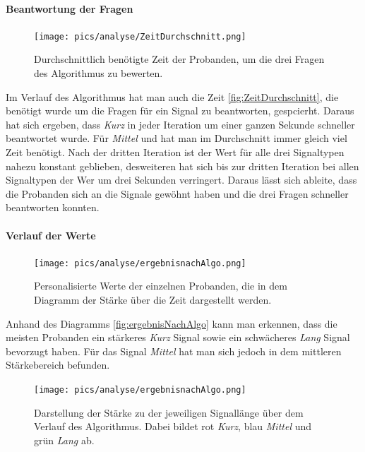 \paragraph{Beantwortung der Fragen}
\begin{figure}[htbp] 
            \centering
   	\texttt{[image: pics/analyse/ZeitDurchschnitt.png]}
	\caption{Durchschnittlich ben{\"o}tigte Zeit der Probanden, um die drei Fragen des Algorithmus zu bewerten.}
	\label{fig:ZeitDurchschnitt}
\end{figure}
Im Verlauf des Algorithmus hat man auch die Zeit \autoref{fig:ZeitDurchschnitt}, die ben{\"o}tigt wurde um die Fragen f{\"u}r ein Signal zu beantworten, gespcierht. 
Daraus hat sich ergeben, dass \textit{Kurz} in jeder Iteration um einer ganzen Sekunde schneller beantwortet wurde. 
F{\"u}r \textit{Mittel} und  hat man im Durchschnitt immer gleich viel Zeit ben{\"o}tigt.
Nach der dritten Iteration ist der Wert f{\"u}r alle drei Signaltypen nahezu konstant geblieben, desweiteren hat sich bis zur dritten Iteration bei allen Signaltypen der Wer um drei Sekunden verringert. 
Daraus l{\"a}sst sich ableite, dass die Probanden sich an die Signale gew{\"o}hnt haben und die drei Fragen schneller beantworten konnten.

\paragraph{Verlauf der Werte}
\begin{figure}[htbp] 
            \centering
   	\texttt{[image: pics/analyse/ergebnisnachAlgo.png]}
	\caption{Personalisierte Werte der einzelnen Probanden, die in dem Diagramm der St{\"a}rke {\"u}ber die Zeit dargestellt werden.}
	\label{fig:ergebnisNachAlgo}
\end{figure}

Anhand des Diagramms \autoref{fig:ergebnisNachAlgo} kann man erkennen, dass die meisten Probanden ein st{\"a}rkeres \textit{Kurz} Signal sowie ein schw{\"a}cheres \textit{Lang} Signal bevorzugt haben. F{\"u}r das Signal \textit{Mittel} hat man sich jedoch in dem mittleren St{\"a}rkebereich befunden.

\begin{figure}[htbp] 
            \centering
   	\texttt{[image: pics/analyse/ergebnisnachAlgo.png]}
	\caption{Darstellung der St{\"a}rke zu der jeweiligen Signall{\"a}nge {\"u}ber dem Verlauf des Algorithmus. Dabei bildet rot \textit{Kurz}, blau \textit{Mittel} und gr{\"u}n \textit{Lang} ab.}
	\label{fig:gruppierung}
\end{figure}

